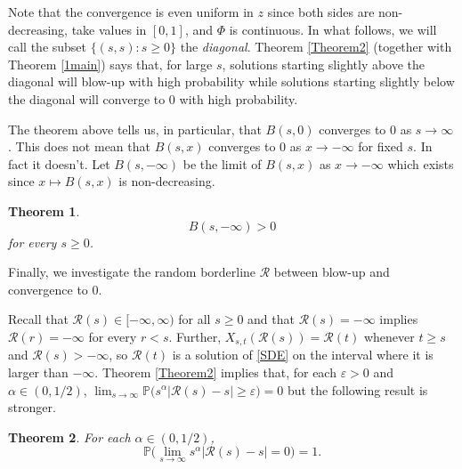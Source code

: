 \documentclass[sn-mathphys-num]{sn-jnl}
\newtheorem{thm}{Theorem}[section]
\theoremstyle{definition}
\newcommand{\scr}[1]{\mathscr #1}
\numberwithin{equation}{section} \theoremstyle{remark}
\def\R{\mathbb R}
\def\RR{\mathscr R}
\def\P{\mathbb P}
\newcommand{\1}{\mathbbm{1}}
\begin{document}
Note that the convergence is even uniform in $z$ since both sides are non-decreasing, take values in $[0,1]$, and $\Phi$ is continuous. In what follows, we will call the subset $\{(s,s): s\geq 0\}$ the {\em diagonal}. Theorem \ref{Theorem2} (together with Theorem \ref{1main}) says that, for large $s$,
solutions starting slightly above the diagonal will blow-up with high probability while solutions starting slightly below the diagonal will converge to 0 with high probability. 

%
%
%
The theorem above tells us, in particular, that $B(s,0)$ converges
to 0 as $s \to \infty$. This does not mean that $B(s,x)$ converges to
0 as $x \to -\infty$ for fixed $s$. In fact it doesn't. Let
$B(s,-\infty)$ be the limit of $B(s,x)$ as $x \to -\infty$ which exists since $x \mapsto B(s,x)$ is non-decreasing.
\begin{thm}\label{Theorem3}
  $$
B(s,-\infty)>0
$$
for every $s \geq 0$.
\end{thm}

Finally, we investigate the random borderline $\RR$ between blow-up and convergence to 0. 

Recall that $\scr{R}(s)\in [-\infty,\infty)$ for all $s \geq 0$ and
that $\scr{R}(s)=-\infty$ implies $\scr{R}(r)=-\infty$ for every
$r<s$. Further, $X_{s,t}(\scr{R}(s))=\scr{R}(t)$ whenever $t\geq s$
and $\scr{R}(s)>-\infty$, so $\scr{R}(t)$ is a solution of \eqref{SDE}
on the interval where it is larger than $-\infty$. Theorem
\ref{Theorem2} implies that, for each $\varepsilon>0$ and
$\alpha \in (0,1/2)$,
$\lim_{s \to \infty}\P\big( s^\alpha|\scr{R}(s)-s|\geq
\varepsilon\big)=0$ but the following result is stronger.
\begin{thm}\label{Theorem4}
  For each $\alpha \in (0,1/2)$,
  $$
\P\big(\lim_{s \to \infty} s^\alpha|\scr{R}(s)-s|=0\big)=1.
  $$
  \end{thm}
\end{document}
